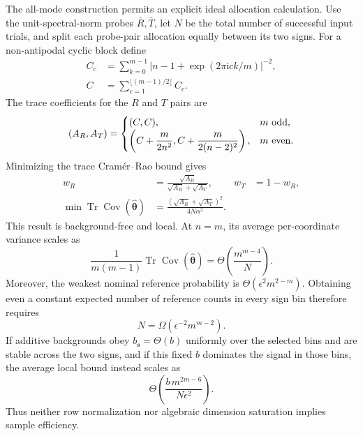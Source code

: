 \documentclass[aps,pra,reprint,amsmath,amssymb,superscriptaddress,longbibliography]{revtex4-2}
\newcommand{\ii}{\mathrm{i}}
\newcommand{\Tr}{\operatorname{Tr}}
\newcommand{\btheta}{\bm{\theta}}
\begin{document}
The all-mode construction permits an explicit ideal allocation calculation.
Use the unit-spectral-norm probes $\bar R,\bar T$, let $N$ be the total
number of successful input trials, and split each probe-pair allocation
equally between its two signs.  For a non-antipodal cyclic block define
\begin{align}
 C_c&=\sum_{k=0}^{m-1}
 |n-1+\exp(2\pi\ii ck/m)|^{-2},\nonumber\\
 C&=\sum_{c=1}^{\lfloor(m-1)/2\rfloor}C_c .
\end{align}
The trace coefficients for the $R$ and $T$ pairs are
\begin{equation}
 (A_R,A_T)=
 \begin{cases}
 (C,C),&m\ {\rm odd},\\
 \left(C+\dfrac{m}{2n^2},
 C+\dfrac{m}{2(n-2)^2}\right),&m\ {\rm even}.
 \end{cases}
\label{eq:allocation-coefficients}
\end{equation}
Minimizing the trace Cramér--Rao bound gives
\begin{align}
 w_R&=\frac{\sqrt{A_R}}{\sqrt{A_R}+\sqrt{A_T}},
 &w_T&=1-w_R,\nonumber\\
 \min\Tr\operatorname{Cov}(\widehat{\btheta})
 &=\frac{(\sqrt{A_R}+\sqrt{A_T})^2}
 {4N\alpha^2}.
\label{eq:optimal-allocation}
\end{align}
This result is background-free and local.  At $n=m$, its average
per-coordinate variance scales as
\begin{equation}
 \frac1{m(m-1)}\Tr\operatorname{Cov}(\widehat{\btheta})
 =\Theta\!\left(\frac{m^{m-4}}{N}\right).
\label{eq:average-cr-scaling}
\end{equation}
Moreover, the weakest nominal reference probability is
$\Theta(\epsilon^2m^{2-m})$.  Obtaining even a constant expected number of
reference counts in every sign bin therefore requires
\begin{equation}
 N=\Omega(\epsilon^{-2}m^{m-2}).
\label{eq:count-threshold}
\end{equation}
If additive backgrounds obey
$b_{\bm s}=\Theta(b)$ uniformly over the selected bins and are stable across
the two signs, and if this fixed $b$ dominates the signal in those bins,
the average local bound instead scales as
\begin{equation}
 \Theta\!\left(
 \frac{b\,m^{2m-6}}{N\epsilon^2}\right).
\label{eq:background-scaling}
\end{equation}
Thus neither row normalization nor algebraic dimension saturation implies
sample efficiency.
\end{document}
